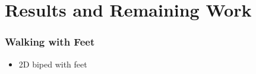 \documentclass{beamer}
\begin{document}
\section{Results and Remaining Work}
\begin{frame}
  \frametitle{Walking with Feet}
  \begin{itemize}
  \item 2D biped with feet
  \end{itemize}
\end{frame}


%
%
%



\end{document}
